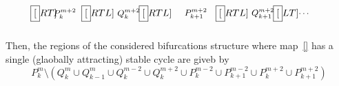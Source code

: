 \documentclass[12pt]{article}
\begin{document}
\begin{enumerate}
\begin{equation}
\begin{split}
            &
            \fbox[RT]{
              \begin{minipage}[c][4em][c]{3em}\small
                \hspace*{-.7em}
                $P^{m+2}_{k}$
              \end{minipage}
            }\hspace*{-1ex}
            \fbox[RTL]{
              \begin{minipage}[c][3em][c]{3em}\small\centering
                $Q^{m+2}_{k}$
              \end{minipage}
            }\hspace*{-1ex}
            \fbox[RTL]{
              \begin{minipage}[c][4em][c]{5em}\small\centering
                $P^{m+2}_{k+1}$
              \end{minipage}
            }\hspace*{-1ex}
            \fbox[RTL]{
              \begin{minipage}[c][3em][c]{3em}\small\centering
                $Q^{m+2}_{k+1}$
              \end{minipage}
            }
            \hspace*{-1ex}
            \fbox[LT]{
              \begin{minipage}[c][4em][c]{2em}\small
                \dots
              \end{minipage}
            }
          \end{split}
        \end{equation}
        Then, the regions of the considered bifurcations structure where
        map~\eqref{} has a single (glaobally attracting) stable cycle
        are giveb by
        \begin{equation}
          P^{m}_k \setminus \left(
          Q^{m}_{k} \cup
          Q^{m}_{k-1} \cup
          Q^{m-2}_{k} \cup
          Q^{m+2}_{k} \cup
          P^{m-2}_{k} \cup
          P^{m-2}_{k+1} \cup
          P^{m+2}_{k} \cup
          P^{m+2}_{k+1}
          \right)
        \end{equation}
\end{enumerate}
\end{document}
